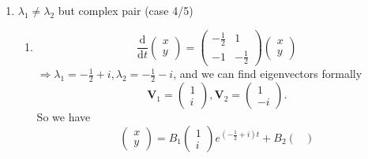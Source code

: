 \documentclass[12pt]{report}
\theoremstyle{definition}
\begin{document}
\begin{ex}
\begin{enumerate}[label = (\roman*)]
                \item $\lambda_1 \neq \lambda_2$ but complex pair (case 4/5)

                    \begin{enumerate}[label = (\alph*)]
                        \item \[
                            \frac{\mathrm{d}}{\mathrm{d}t} \begin{pmatrix}
                                    x \\
                                    y
                            \end{pmatrix} = \begin{pmatrix}
                            -\frac{1}{2} & 1 \\
                            -1 & -\frac{1}{2}
                            \end{pmatrix} \begin{pmatrix}
                                    x \\
                                    y
                            \end{pmatrix} 
                        \]$\Rightarrow{}
                        \lambda_1 = -\frac{1}{2} + i, \lambda_2 = -\frac{1}{2}-i$,
                        and we can find eigenvectors formally \[
                            \mathbf{V}_1 = \begin{pmatrix}
                                    1 \\
                                    i
                            \end{pmatrix}, \mathbf{V}_2 = \begin{pmatrix}
                                    1 \\
                                    -i
                            \end{pmatrix}.
                        \]So we have\[
                            \begin{pmatrix}
                                    x \\
                                    y
                            \end{pmatrix} = B_1\begin{pmatrix}
                                    1 \\
                                    i
                            \end{pmatrix} e^{(-\frac{1}{2} + i)t} + B_2 \begin{pmatrix}

\end{pmatrix}\]
\end{enumerate}
\end{enumerate}
\end{ex}
\end{document}
